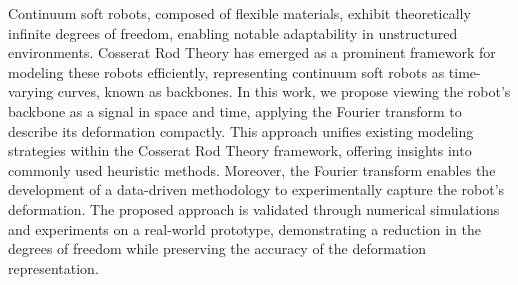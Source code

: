 Continuum soft robots, composed of flexible materials, exhibit theoretically infinite degrees of freedom, enabling notable adaptability in unstructured environments. Cosserat Rod Theory has emerged as a prominent framework for modeling these robots efficiently, representing continuum soft robots as time-varying curves, known as backbones. In this work, we propose viewing the robot's backbone as a signal in space and time, applying the Fourier transform to describe its deformation compactly. This approach unifies existing modeling strategies within the Cosserat Rod Theory framework, offering insights into commonly used heuristic methods. Moreover, the Fourier transform enables the development of a data-driven methodology to experimentally capture the robot's deformation. 
The proposed approach is validated through numerical simulations and experiments on a real-world prototype, demonstrating a reduction in the degrees of freedom while preserving the accuracy of the deformation representation.